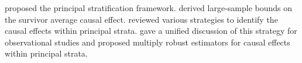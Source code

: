 \begin{HomeworkProblem}\label{exr:26-5}

\citet{frangakis2002principal}  proposed the principal stratification framework.
\citet{zhang2003estimation} derived large-sample bounds on the survivor average causal effect.
\citet{jiang2020identification} reviewed various strategies to identify the causal effects within principal strata.
\citet{jiang2020multiply} gave a unified discussion of this strategy for observational studies and proposed multiply robust estimators for causal effects within principal strata.


\end{HomeworkProblem}
